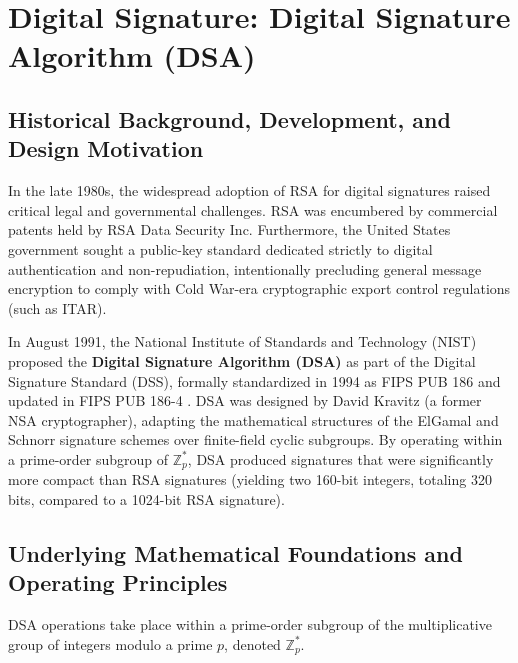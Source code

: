 \chapter{Digital Signature: Digital Signature Algorithm (DSA)}
\label{ch:dsa}

\section{Historical Background, Development, and Design Motivation}
In the late 1980s, the widespread adoption of RSA for digital signatures raised critical legal and governmental challenges. RSA was encumbered by commercial patents held by RSA Data Security Inc. Furthermore, the United States government sought a public-key standard dedicated strictly to digital authentication and non-repudiation, intentionally precluding general message encryption to comply with Cold War-era cryptographic export control regulations (such as ITAR).

In August 1991, the National Institute of Standards and Technology (NIST) proposed the \textbf{Digital Signature Algorithm (DSA)} as part of the Digital Signature Standard (DSS), formally standardized in 1994 as FIPS PUB 186 and updated in FIPS PUB 186-4 \cite{fips186_4}. DSA was designed by David Kravitz (a former NSA cryptographer), adapting the mathematical structures of the ElGamal and Schnorr signature schemes over finite-field cyclic subgroups. By operating within a prime-order subgroup of $\mathbb{Z}_p^*$, DSA produced signatures that were significantly more compact than RSA signatures (yielding two 160-bit integers, totaling 320 bits, compared to a 1024-bit RSA signature).

\section{Underlying Mathematical Foundations and Operating Principles}
DSA operations take place within a prime-order subgroup of the multiplicative group of integers modulo a prime $p$, denoted $\mathbb{Z}_p^*$.

